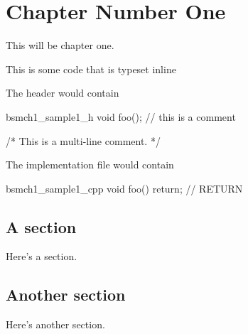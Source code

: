 \chapter{Chapter Number One}

This will be chapter one.

This is some code that is typeset inline 

The header would contain
\begin{cppcodeblock}{bsmch1_sample1_h}
  void foo(); // this is a comment

  /*
  This is a multi-line comment.
  */
\end{cppcodeblock}

The implementation file would contain
\begin{cppcodeblock}{bsmch1_sample1_cpp}
void foo() {
  return;                                                             // RETURN
}
\end{cppcodeblock}

\section{A section}

Here's a section.

\section{Another section}

Here's another section.


